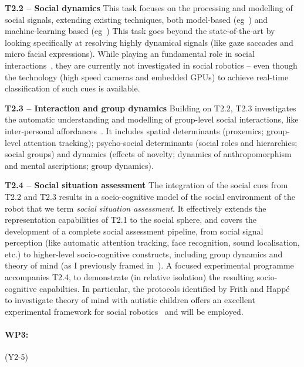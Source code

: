 \documentclass[11pt,a4paper]{report}
\begin{document}
\textbf{T2.2 -- Social dynamics} This task focuses on the processing and
modelling of social signals, extending existing techniques, both model-based
(eg~\cite{lemaignan2016realtime,others}) and machine-learning based
(eg~\cite{chetouani,others}) This task goes beyond the state-of-the-art by
looking specifically at resolving highly dynamical signals (like gaze saccades
and micro facial expressions). While playing an fundamental role in social
interactions~\cite{citeneeded}, they are currently not investigated in social
robotics -- even though the technology (high speed cameras and embedded GPUs) to
achieve real-time classification of such cues is available.

\textbf{T2.3 -- Interaction and group dynamics} Building on T2.2, T2.3
investigates the automatic understanding and modelling of group-level social
interactions, like inter-personal affordances~\cite{pandey2013affordance}. It
includes spatial determinants (proxemics; group-level attention tracking);
psycho-social determinants (social roles and hierarchies; social groups) and
dynamics (effects of novelty; dynamics of anthropomorphism and mental
ascriptions; group dynamics). 


\textbf{T2.4 -- Social situation assessment} The integration of the social cues
from T2.2 and T2.3 results in a socio-cognitive model of the social environment
of the robot that we term \emph{social situation assessment}.  It effectively
extends the representation capabilities of T2.1 to the social sphere, and covers
the development of a complete social assessment pipeline, from social signal
perception (like automatic attention tracking, face recognition, sound
localisation, etc.) to higher-level socio-cognitive constructs, including group
dynamics and theory of mind (as I previously framed
in~\cite{lemaignan2015mutual, dillenbourg2016symmetry}). A focused experimental
programme accompanies T2.4, to demonstrate (in relative isolation) the resulting
socio-cognitive capabilties. In particular, the protocols identified by Frith
and Happé~\cite{frith1994autism} to investigate theory of mind with autistic
children offers an excellent experimental framework for social
robotics~\cite{lemaignan2015mutual} and will be employed.

\paragraph{WP3: \textbf{\wpThree}} (Y2-5)
\end{document}
